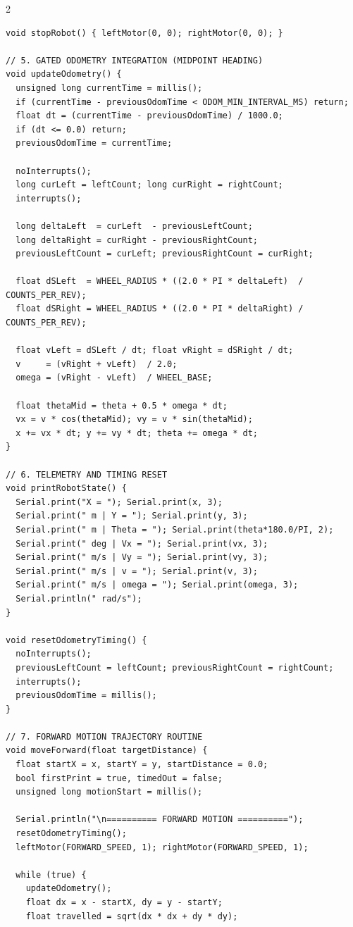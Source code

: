 \documentclass[11pt,a4paper]{article}
\begin{document}
\begin{multicols}{2}
\begin{lstlisting}
void stopRobot() { leftMotor(0, 0); rightMotor(0, 0); }

// 5. GATED ODOMETRY INTEGRATION (MIDPOINT HEADING)
void updateOdometry() {
  unsigned long currentTime = millis();
  if (currentTime - previousOdomTime < ODOM_MIN_INTERVAL_MS) return;
  float dt = (currentTime - previousOdomTime) / 1000.0;
  if (dt <= 0.0) return;
  previousOdomTime = currentTime;

  noInterrupts();
  long curLeft = leftCount; long curRight = rightCount;
  interrupts();

  long deltaLeft  = curLeft  - previousLeftCount;
  long deltaRight = curRight - previousRightCount;
  previousLeftCount = curLeft; previousRightCount = curRight;

  float dSLeft  = WHEEL_RADIUS * ((2.0 * PI * deltaLeft)  / COUNTS_PER_REV);
  float dSRight = WHEEL_RADIUS * ((2.0 * PI * deltaRight) / COUNTS_PER_REV);

  float vLeft = dSLeft / dt; float vRight = dSRight / dt;
  v     = (vRight + vLeft)  / 2.0;
  omega = (vRight - vLeft)  / WHEEL_BASE;

  float thetaMid = theta + 0.5 * omega * dt;
  vx = v * cos(thetaMid); vy = v * sin(thetaMid);
  x += vx * dt; y += vy * dt; theta += omega * dt;
}

// 6. TELEMETRY AND TIMING RESET
void printRobotState() {
  Serial.print("X = "); Serial.print(x, 3);
  Serial.print(" m | Y = "); Serial.print(y, 3);
  Serial.print(" m | Theta = "); Serial.print(theta*180.0/PI, 2);
  Serial.print(" deg | Vx = "); Serial.print(vx, 3);
  Serial.print(" m/s | Vy = "); Serial.print(vy, 3);
  Serial.print(" m/s | v = "); Serial.print(v, 3);
  Serial.print(" m/s | omega = "); Serial.print(omega, 3);
  Serial.println(" rad/s");
}

void resetOdometryTiming() {
  noInterrupts();
  previousLeftCount = leftCount; previousRightCount = rightCount;
  interrupts();
  previousOdomTime = millis();
}

// 7. FORWARD MOTION TRAJECTORY ROUTINE
void moveForward(float targetDistance) {
  float startX = x, startY = y, startDistance = 0.0;
  bool firstPrint = true, timedOut = false;
  unsigned long motionStart = millis();

  Serial.println("\n========== FORWARD MOTION ==========");
  resetOdometryTiming();
  leftMotor(FORWARD_SPEED, 1); rightMotor(FORWARD_SPEED, 1);

  while (true) {
    updateOdometry();
    float dx = x - startX, dy = y - startY;
    float travelled = sqrt(dx * dx + dy * dy);


\end{lstlisting}
\end{multicols}
\end{document}
